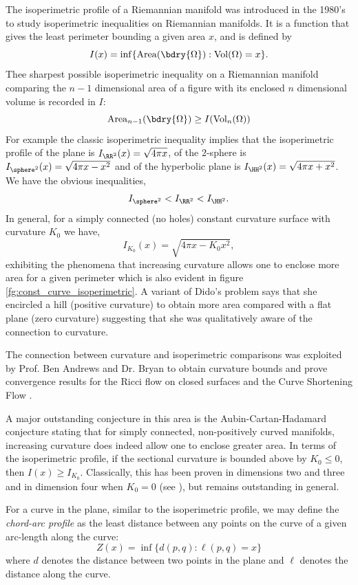 \documentclass[12pt]{amsart}
\begin{document}
The isoperimetric profile of a Riemannian manifold was introduced in the 1980's \cite{MR875084,MR999971} to study isoperimetric inequalities on Riemannian manifolds. It is a function that gives the least perimeter bounding a given area \(x\), and is defined by
\[
I(x) = \inf\{\operatorname{Area} (\bdry{\Omega}) : \operatorname{Vol}(\Omega) = x\}.
\]
Thee sharpest possible isoperimetric inequality on a Riemannian manifold comparing the \(n-1\) dimensional area of a figure with its enclosed \(n\) dimensional volume is recorded in \(I\):
\[
\operatorname{Area}_{n-1} (\bdry{\Omega}) \geq I(\operatorname{Vol}_n(\Omega))
\]
For example the classic isoperimetric inequality implies that the isoperimetric profile of the plane is \(I_{\RR^2}(x) = \sqrt{4\pi x}\), of the $2$-sphere is \(I_{\sphere^2}(x) = \sqrt{4\pi x - x^2}\) and of the hyperbolic plane is \(I_{\HH^2} (x) = \sqrt{4\pi x + x^2}\). We have the obvious inequalities,
\[
I_{\sphere^2} < I_{\RR^2} < I_{\HH^2}.
\]
In general, for a simply connected (no holes) constant curvature surface with curvature \(K_0\) we have,
\[
I_{K_0}(x) = \sqrt{4\pi x - K_0 x^2},
\]
exhibiting the phenomena that increasing curvature allows one to enclose more area for a given perimeter which is also evident in figure \ref{fg:const_curve_isoperimetric}. A variant of Dido's problem says that she encircled a hill (positive curvature) to obtain more area compared with a flat plane (zero curvature) suggesting that she was qualitatively aware of the connection to curvature.

The connection between curvature and isoperimetric comparisons was exploited by Prof. Ben Andrews and Dr. Bryan to obtain curvature bounds and prove convergence results for the Ricci flow on closed surfaces and the Curve Shortening Flow \cite{MR2729306,MR2843240,pbthesis,Bryan}.

A major outstanding conjecture in this area is the Aubin-Cartan-Hadamard conjecture \cite{MR936419} stating that for simply connected, non-positively curved manifolds, increasing curvature does indeed allow one to enclose greater area. In terms of the isoperimetric profile, if the sectional curvature is bounded above by \(K_0 \leq 0\), then \(I(x) \geq I_{K_0}\). Classically, this has been proven in dimensions two and three and in dimension four when \(K_0 = 0\) (see \cite{MR2167269}), but remains outstanding in general.

For a curve in the plane, similar to the isoperimetric profile, we may define the \emph{chord-arc profile} as the least distance between any points on the curve of a given arc-length along the curve:
\[
Z(x) = \inf\{d(p, q) : \ell(p, q) = x\}
\]
where \(d\) denotes the distance between two points in the plane and \(\ell\) denotes the distance along the curve.
\end{document}
